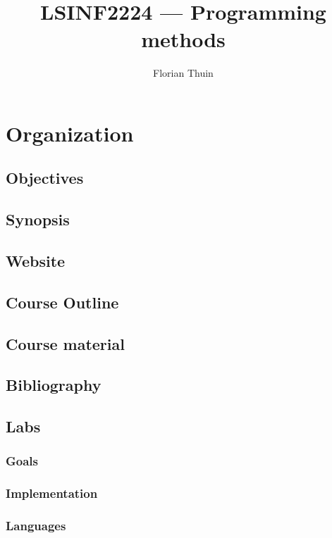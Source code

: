 \documentclass[12pt, a4paper]{book}
\author{Florian Thuin}
\title{LSINF2224 --- Programming methods}
\begin{document}
    \maketitle
    \tableofcontents
  \section{Organization}
  \label{sec:Organization}

  \subsection{Objectives}
  \label{sub:Objectives}
  \subsection{Synopsis}
  \label{sub:Synopsis}
  \subsection{Website}
  \label{sub:Website}
  \subsection{Course Outline}
  \label{sub:Course Outline}
  \subsection{Course material}
  \label{sub:Course material}
  \subsection{Bibliography}
  \label{sub:Bibliography}
  \subsection{Labs}
  \label{sub:Labs}
  \subsubsection{Goals}
  \label{subs:Goals}
  \subsubsection{Implementation}
  \label{subs:Implementation}
  \subsubsection{Languages}
  \label{subs:Languages}
\end{document}
